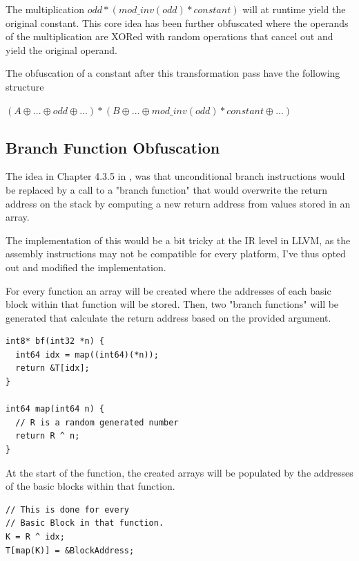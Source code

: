 The multiplication $ odd * (mod\_inv(odd) * constant)$ will at runtime yield the original constant. This core idea has been further obfuscated
where the operands of the multiplication are XORed with random operations that cancel out and yield the original operand.

The obfuscation of a constant after this transformation pass have the following structure

$(A \oplus ... \oplus odd \oplus ...) * (B \oplus ... \oplus mod\_inv(odd) * constant \oplus ...)$

\subsection{Branch Function Obfuscation}

The idea in Chapter 4.3.5 in \cite{ss-chpt4}, was that unconditional branch instructions would be replaced by a call to a
"branch function" that would overwrite the return address on the stack by computing a new return address from values stored in an array.

The implementation of this would be a bit tricky at the IR level in LLVM, as the assembly instructions may not be compatible for every platform,
I've thus opted out and modified the implementation.

For every function an array will be created where the addresses of each basic block within that function will be stored.
Then, two "branch functions" will be generated that calculate the return address based on the provided argument.

\lstset{language=C++} %
\lstset{basicstyle=\ttfamily} %
\begin{lstlisting}
int8* bf(int32 *n) {
  int64 idx = map((int64)(*n));
  return &T[idx];
}

int64 map(int64 n) {
  // R is a random generated number
  return R ^ n;
}

\end{lstlisting}

At the start of the function, the created arrays will be populated by the addresses
of the basic blocks within that function.

\lstset{language=C++} %
\lstset{basicstyle=\ttfamily} %
\begin{lstlisting}
// This is done for every
// Basic Block in that function.
K = R ^ idx;
T[map(K)] = &BlockAddress;
\end{lstlisting}

